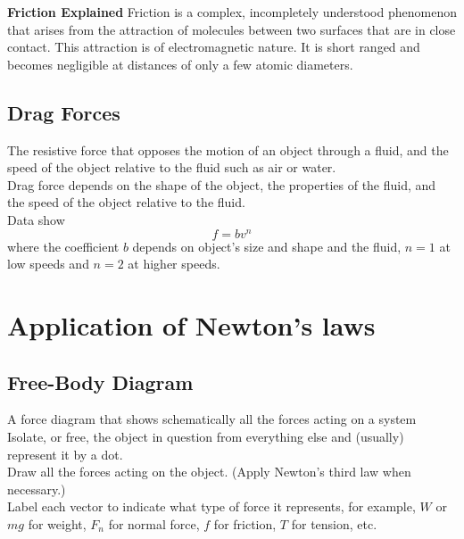 \documentclass[11pt,a4paper]{report}
\begin{document}
\hspace{1mm}

\noindent
\textbf{Friction Explained} Friction is a complex, incompletely understood phenomenon that arises from the attraction of molecules between two surfaces that are in close contact. This attraction is of electromagnetic nature. It is short ranged and becomes negligible at distances of only a few atomic diameters.

\subsection{Drag Forces}
The resistive force that opposes the motion of an object through a fluid, and the speed of the object relative to the fluid such as air or water.
\\Drag force depends on the shape of the object, the properties of the fluid, and the speed of the object relative to the fluid.
\\Data show $$f = b v^n$$ where the coefficient $b$ depends on object's size and shape and the fluid, $n = 1$ at low speeds and $n = 2$ at higher speeds.

\section{Application of Newton's laws}

\subsection{Free-Body Diagram}
A force diagram that shows schematically all the forces acting on a system
\\Isolate, or free, the object in question from everything else and (usually) represent it by a dot.
\\Draw all the forces acting on the object. (Apply Newton's third law when necessary.)
\\Label each vector to indicate what type of force it represents, for example, $W$ or $mg$ for weight, $F_n$ for normal force, $f$ for friction, $T$ for tension, etc.

\hspace{1mm}

\end{document}
